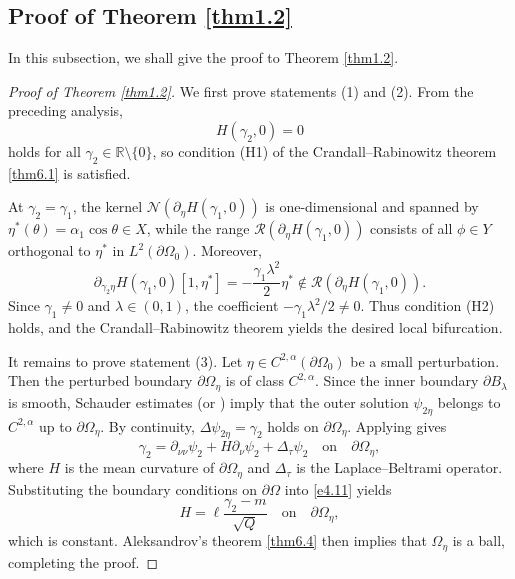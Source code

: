 \documentclass[reqno]{amsart}
\numberwithin{equation}{section}
\numberwithin{equation}{section}
\numberwithin{equation}{section}
\begin{document}
\subsection{Proof of Theorem \ref{thm1.2}}
In this subsection, we shall give the proof to Theorem \ref{thm1.2}.
\begin{proof}[Proof of Theorem \ref{thm1.2}]
We first prove statements (1) and (2). From the preceding analysis,
\begin{equation}
H(\gamma_2,0) = 0 \nonumber
\end{equation}
holds for all \(\gamma_2 \in \mathbb{R} \setminus \{0\}\), so condition (H1) of the Crandall--Rabinowitz theorem \ref{thm6.1} is satisfied.

At \(\gamma_2 = \gamma_1\), the kernel \(\mathcal{N}(\partial_\eta H(\gamma_1,0))\) is one-dimensional and spanned by \(\eta^*(\theta) = \alpha_1 \cos\theta \in X\), while the range \(\mathcal{R}(\partial_\eta H(\gamma_1,0))\) consists of all \(\phi \in Y\) orthogonal to \(\eta^*\) in \(L^2(\partial \Omega_0)\). Moreover,
\begin{equation}
\partial_{\gamma_2 \eta} H(\gamma_1,0)[1,\eta^*] = -\frac{\gamma_1 \lambda^2}{2} \eta^* \notin \mathcal{R}(\partial_\eta H(\gamma_1,0)). \nonumber
\end{equation}
Since \(\gamma_1 \neq 0\) and \(\lambda \in (0,1)\), the coefficient \(-\gamma_1 \lambda^2 / 2 \neq 0\). Thus condition (H2) holds, and the Crandall--Rabinowitz theorem yields the desired local bifurcation.

It remains to prove statement (3). Let \(\eta \in C^{2,\alpha}(\partial \Omega_0)\) be a small perturbation. Then the perturbed boundary \(\partial \Omega_\eta\) is of class \(C^{2,\alpha}\). Since the inner boundary \(\partial B_\lambda\) is smooth, Schauder estimates \cite[Theorems 6.8 and 6.9]{Gilbarg} (or \cite[Lemma 2.1]{FallMW}) imply that the outer solution \(\psi_{2\eta}\) belongs to \(C^{2,\alpha}\) up to \(\partial \Omega_\eta\). By continuity, \(\Delta \psi_{2\eta} = \gamma_2\) holds on \(\partial \Omega_\eta\). Applying \cite[Proposition 5.4.12]{HenrotP} gives
\begin{equation}\label{e4.11}
\gamma_2 = \partial_{\nu\nu} \psi_2 + H \partial_\nu \psi_2 + \Delta_\tau \psi_2 \quad \text{on}\quad \partial \Omega_\eta,
\end{equation}
where \(H\) is the mean curvature of \(\partial \Omega_\eta\) and \(\Delta_\tau\) is the Laplace--Beltrami operator. Substituting the boundary conditions on $\partial\Omega$ into \eqref{e4.11} yields
\[
H = \ell \frac{\gamma_2 - m}{\sqrt{Q}} \quad \text{on}\quad \partial \Omega_\eta,
\]
which is constant. Aleksandrov's theorem \ref{thm6.4} then implies that \(\Omega_\eta\) is a ball, completing the proof.
\end{proof}
\end{document}
